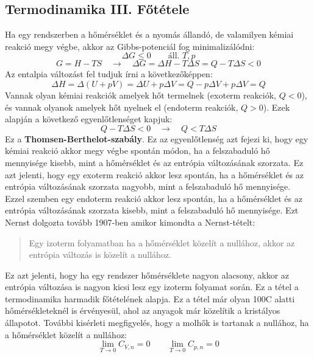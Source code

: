 \documentclass[../main.tex]{subfiles}
\begin{document}
\subsection{Termodinamika III. Főtétele}
Ha egy rendszerben a hőmérséklet és a nyomás állandó, de valamilyen kémiai reakció megy végbe, akkor az Gibbs-potenciál fog minimalizálódni:
\begin{equation}
    \Delta G \leq 0 \qquad \text{áll. } T, p
\end{equation}
\begin{equation}
    G = H - TS \quad \to \quad \Delta G = \Delta H - T \Delta S = Q - T \Delta S < 0
\end{equation}
Az entalpia változást fel tudjuk írni a következőképpen:
\begin{equation}
    \Delta H =  \Delta (U + pV) = \Delta U + p\Delta V = Q - p \Delta V + p \Delta V = Q
\end{equation}
Vannak olyan kémiai reakciók amelyek hőt termelnek (exoterm reakciók, $Q < 0$), és vannak olyanok amelyek hőt nyelnek el (endoterm reakciók, $Q > 0$). 
Ezek alapján a következő egyenlőtlenséget kapjuk:
\begin{equation}
    Q - T \Delta S < 0 \quad \to \quad Q < T \Delta S
\end{equation}
Ez a \textbf{Thomsen-Berthelot-szabály}. Ez az egyenlőtlenség azt fejezi ki, hogy egy kémiai reakció akkor megy végbe spontán módon, ha a felszabaduló hő mennyisége kisebb, mint a hőmérséklet és az entrópia változásának szorzata.
Ez azt jelenti, hogy egy exoterm reakció akkor lesz spontán, ha a hőmérséklet és az entrópia változásának szorzata nagyobb, mint a felszabaduló hő mennyisége.
Ezzel szemben egy endoterm reakció akkor lesz spontán, ha a hőmérséklet és az entrópia változásának szorzata kisebb, mint a felszabaduló hő mennyisége. Ezt Nernst dolgozta tovább
1907-ben amikor kimondta a Nernst-tételt:
\begin{quote}
    Egy izoterm folyamatban ha a hőmérséklet közelít a nullához, akkor az entrópia változás is közelít a nullához.
\end{quote}
Ez azt jelenti, hogy ha egy rendszer hőmérséklete nagyon alacsony, akkor az entrópia változása is nagyon kicsi lesz egy izoterm folyamat során. Ez a tétel a termodinamika harmadik főtételének alapja.
Ez a tétel már olyan 100\degree C alatti hőmérsékleteknél is érvényesül, ahol az anyagok már közelítik a kristályos állapotot. További kisérleti megfigyelés, hogy
a molhők is tartanak a nullához, ha a hőmérséklet közelít a nullához:
\begin{equation}
    \lim_{T \to 0} C_{V,n} = 0 \qquad \lim_{T \to 0} C_{p,n} = 0
\end{equation}
\end{document}

